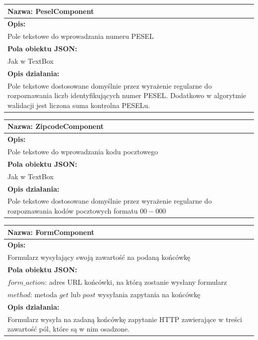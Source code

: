 \documentclass[licencjacka]{pracamgr}
\begin{document}
\begin{tabularx}{\linewidth}{|X|}\hline
\textbf{Nazwa:}
PeselComponent
\\\hline
\textbf{Opis:}\\

Pole tekstowe do wprowadzania numeru PESEL\\
\hline
\textbf{Pola obiektu JSON:} \\
Jak w TextBox
\\\hline
\textbf{Opis działania:}\\
Pole tekstowe dostosowane domyślnie przez wyrażenie regularne do rozpoznawania liczb identyfikujących numer PESEL.
Dodatkowo w algorytmie walidacji jest liczona suma kontrolna PESELu.
\\\hline
\end{tabularx}


\begin{tabularx}{\linewidth}{|X|}\hline
\textbf{Nazwa:}
ZipcodeComponent
\\\hline
\textbf{Opis:}\\

Pole tekstowe do wprowadzania kodu pocztowego\\
\hline
\textbf{Pola obiektu JSON:} \\
Jak w TextBox
\\\hline
\textbf{Opis działania:}\\
Pole tekstowe dostosowane domyślnie przez wyrażenie regularne do rozpoznawania kodów pocztowych formatu $00-000$
\\\hline
\end{tabularx}

\begin{tabularx}{\linewidth}{|X|}\hline
\textbf{Nazwa:}
FormComponent
\\\hline
\textbf{Opis:}\\

Formularz wysyłający swoją zawartość na podaną końcówkę\\
\hline
\textbf{Pola obiektu JSON:} \\
$form\_action$: adres URL końcówki, na którą zostanie wysłany formularz\\
$method$: metoda $get$ lub $post$ wysyłania zapytania na końcówkę\\
\hline
\textbf{Opis działania:}\\
Formularz wysyła na zadaną końcówkę zapytanie HTTP zawierające w treści zawartość pól, które są w nim osadzone.
\\\hline
\end{tabularx}
\end{document}
